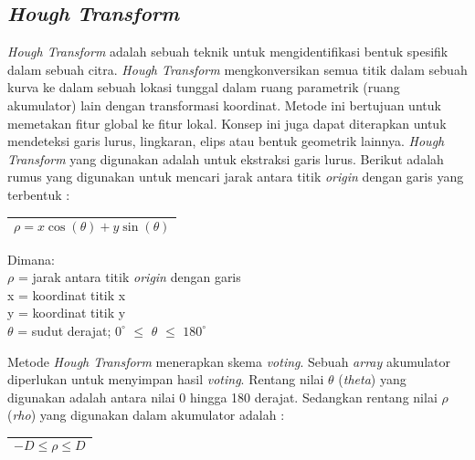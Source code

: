 \subsection{\textit{Hough Transform}}
\noindent \textit{Hough Transform} adalah sebuah teknik untuk mengidentifikasi bentuk spesifik dalam sebuah citra. \textit{Hough Transform} mengkonversikan semua titik dalam sebuah kurva ke dalam sebuah lokasi tunggal dalam ruang parametrik (ruang akumulator) lain dengan transformasi koordinat. Metode ini bertujuan untuk memetakan fitur global ke fitur lokal. Konsep ini juga dapat diterapkan untuk mendeteksi garis lurus, lingkaran, elips atau bentuk geometrik lainnya. \textit{Hough Transform} yang digunakan adalah untuk ekstraksi garis lurus. Berikut adalah rumus yang digunakan untuk mencari jarak antara titik \textit{origin} dengan garis yang terbentuk \cite{shih}:

\begin{table}[H]
	\begin{adjustbox}{width=1\textwidth}
		\begin{tabular}{|p{13.55cm}|}
			\hline
			\begin{equation}
			\rho = x\cos(\theta)+y\sin(\theta)
			\label{eq:PersamaanRho}
			\end{equation}\\
			\hline
		\end{tabular}
	\end{adjustbox}
\end{table}

\noindent Dimana:\\
$\rho$ = jarak antara titik \textit{origin} dengan garis\\
x = koordinat titik x\\
y = koordinat titik y\\
$\theta$ = sudut derajat; $0^\circ$ $\leq$ $\theta$ $\leq$ $180^\circ$

\noindent Metode \textit{Hough Transform} menerapkan skema \textit{voting}. Sebuah \textit{array} akumulator diperlukan untuk menyimpan hasil \textit{voting}. Rentang nilai $\theta$ (\textit{theta}) yang digunakan adalah antara nilai 0 hingga 180 derajat. Sedangkan rentang nilai $\rho$ (\textit{rho}) yang digunakan dalam akumulator adalah \cite{comvis}:

\begin{table}[H]
	\begin{adjustbox}{width=1\textwidth}
		\begin{tabular}{|p{13.55cm}|}
			\hline
			\begin{equation}
			-D \leq \rho \leq D
			\end{equation}\\
			\hline
		\end{tabular}
	\end{adjustbox}
\end{table}

